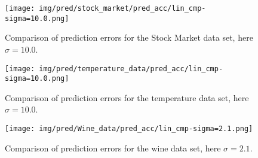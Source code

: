 
\begin{figure}[ht]
    \centering
    \texttt{[image: img/pred/stock\_market/pred\_acc/lin\_cmp-sigma=10.0.png]}
    \caption{Comparison of prediction errors for the Stock Market data set, here $\sigma=10.0$.}
    \label{fig: minres-cg-stock_market-ferr}
\end{figure}


\begin{figure}[ht]
    \centering
    \texttt{[image: img/pred/temperature\_data/pred\_acc/lin\_cmp-sigma=10.0.png]}
    \caption{Comparison of prediction errors for the temperature data set, here $\sigma=10.0$.}
    \label{fig: minres-cg-temperature_data-ferr}
\end{figure}


\begin{figure}[ht]
    \centering
    \texttt{[image: img/pred/Wine\_data/pred\_acc/lin\_cmp-sigma=2.1.png]}
    \caption{Comparison of prediction errors for the wine data set, here $\sigma=2.1$.}
    \label{fig: minres-cg-Wine_data-ferr}
\end{figure}

\clearpage